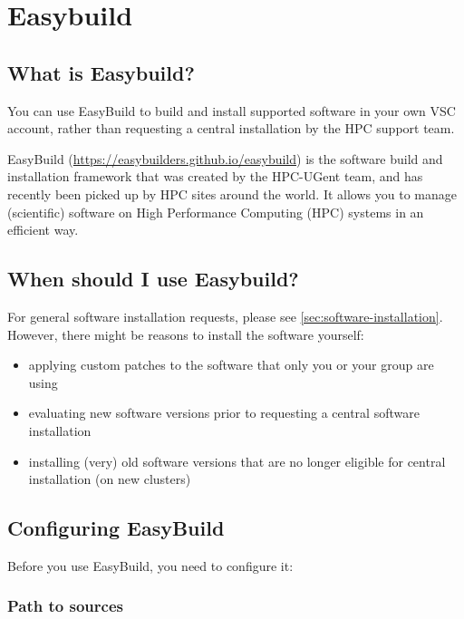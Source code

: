 \chapter{Easybuild}
\label{ch:easybuild}

\section{What is Easybuild?}

You can use EasyBuild to build and install supported software in your own VSC account,
rather than requesting a central installation by the HPC support team.

EasyBuild (\url{https://easybuilders.github.io/easybuild}) is the software build and installation framework that was created by the HPC-UGent
team, and has recently been picked up by HPC sites around the world. It allows you to manage
(scientific) software on High Performance Computing (HPC) systems in an efficient way.

\section{When should I use Easybuild?}

For general software installation requests, please see \autoref{sec:software-installation}. However,
there might be reasons to install the software yourself:

\begin{itemize}
    \item applying custom patches to the software that only you or your group are using
    \item evaluating new software versions prior to requesting a central software installation
    \item installing (very) old software versions that are no longer eligible for central installation (on new clusters)
\end{itemize}

\section{Configuring EasyBuild}

Before you use EasyBuild, you need to configure it:

\subsection{Path to sources}

